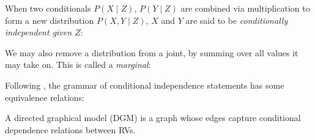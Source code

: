 \documentclass{article}
\begin{document}
\begin{prooftree}
\end{prooftree}

When two conditionals $P(X \mid Z)$, $P(Y \mid Z)$ are combined via multiplication to form a new distribution $P(X, Y \mid Z)$, $X$ and $Y$ are said to be \textit{conditionally independent given $Z$}:

\begin{prooftree}
\end{prooftree}

We may also remove a distribution from a joint, by summing over all values it may take on. This is called a \textit{marginal}:

\begin{prooftree}
\end{prooftree}

Following \citet{pearl1985graphoids}, the grammar of conditional independence statements has some equivalence relations:


\begin{prooftree}
\end{prooftree}

\begin{prooftree}
\end{prooftree}

\begin{prooftree}
\end{prooftree}

\begin{prooftree}
\end{prooftree}

A directed graphical model (DGM) is a graph whose edges capture conditional dependence relations between RVs.
\end{document}
